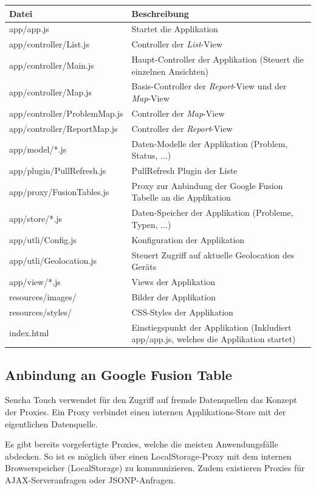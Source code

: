 \begin{longtable}{|l|p{9.5cm}|}
\hline 
\textbf{Datei} & \textbf{Beschreibung} \\ 
\hline 
app/app.js & Startet die Applikation \\ 
\hline 
app/controller/List.js & Controller der \emph{List}-View \\ 
\hline 
app/controller/Main.js & Haupt-Controller der Applikation (Steuert die einzelnen Ansichten) \\ 
\hline 
app/controller/Map.js & Basis-Controller der \emph{Report}-View und der \emph{Map}-View \\ 
\hline 
app/controller/ProblemMap.js & Controller der \emph{Map}-View \\ 
\hline 
app/controller/ReportMap.js & Controller der \emph{Report}-View \\ 
\hline 
app/model/*.js & Daten-Modelle der Applikation (Problem, Status, ...) \\ 
\hline 
app/plugin/PullRefresh.js & PullRefresh Plugin der Liste \\ 
\hline 
app/proxy/FusionTables.js & Proxy zur Anbindung der Google Fusion Tabelle an die Applikation \\ 
\hline 
app/store/*.js & Daten-Speicher der Applikation (Probleme, Typen, ...) \\ 
\hline 
app/utli/Config.js & Konfiguration der Applikation \\ 
\hline 
app/utli/Geolocation.js & Steuert Zugriff auf aktuelle Geolocation des Geräts \\ 
\hline 
app/view/*.js & Views der Applikation \\ 
\hline 
resources/images/ & Bilder der Applikation \\ 
\hline 
resources/styles/ & CSS-Styles der Applikation \\ 
\hline 
index.html & Einstiegspunkt der Applikation (Inkludiert app/app.js, welches die Applikation startet) \\ 
\hline
\end{longtable} 

\subsection{Anbindung an Google Fusion Table}
\label{fusiontablesproxy}
Sencha Touch verwendet für den Zugriff auf fremde Datenquellen das Konzept der Proxies. Ein Proxy verbindet einen internen Applikations-Store mit der eigentlichen Datenquelle.

Es gibt bereits vorgefertigte Proxies, welche die meisten Anwendungsfälle abdecken. So ist es möglich über einen LocalStorage-Proxy mit dem internen Browserspeicher (LocalStorage) zu kommunizieren. Zudem existieren Proxies für AJAX-Serveranfragen oder JSONP-Anfragen.

